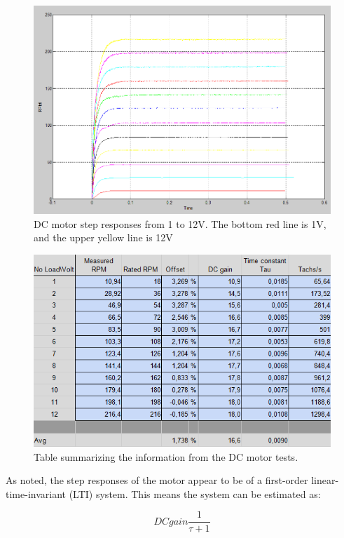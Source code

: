 \begin{figure}[h!]
\centering
\includegraphics[scale=0.4]{Billeder/Stepresponses1to12V.png}
\caption{DC motor step responses from 1 to 12V. The bottom red line is 1V, and the upper yellow line is 12V}
\label{fig:stepresponses1to12V}
\end{figure}

\begin{figure}[h!]
\centering
\includegraphics[scale=0.7]{Billeder/StepResponseData}
\caption{Table summarizing the information from the DC motor tests.}
\label{fig:StepResponseData}
\end{figure}

As noted, the step responses of the motor appear to be of a first-order linear-time-invariant (LTI) system. This means the system can be estimated as:

\begin{equation}
DCgain\frac{1}{\tau+1}
\end{equation}

